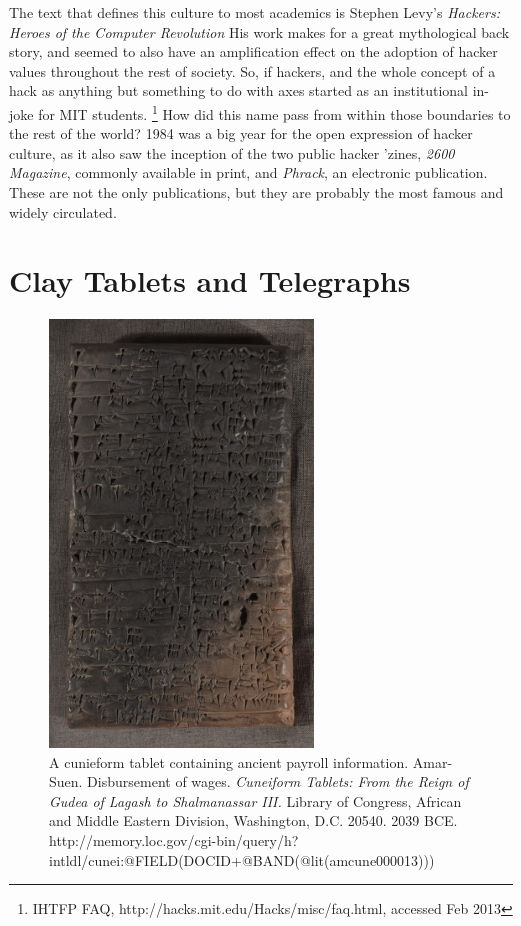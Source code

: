 \documentclass[11pt]{article}
\begin{document}
The text that defines this culture to most academics is Stephen Levy's \emph{Hackers: Heroes of the Computer Revolution}  His work makes for a great mythological back story, and seemed to also have an amplification effect on the adoption of hacker values throughout the rest of society.  So, if hackers, and the whole concept of a hack as anything but something to do with axes started as an institutional in-joke for MIT students.
\footnote{IHTFP FAQ,  http://hacks.mit.edu/Hacks/misc/faq.html, accessed Feb 2013}
How did this name pass from within those boundaries to the rest of the world? 1984 was a big year for the open expression of hacker culture, as it also saw the inception of the two public hacker 'zines, \emph{2600 Magazine}, commonly available in print, and \emph{Phrack}, an electronic publication. These are not the only publications, but they are probably the most famous and widely circulated.

\newpage
\section{Clay Tablets and Telegraphs}

\begin{figure}[ht!]
\center
\includegraphics[width=70mm, angle=90]{cuniform_tablet.jpg}
\caption{A cunieform tablet containing ancient payroll information. Amar-Suen. Disbursement of wages. \emph{Cuneiform Tablets: From the Reign of Gudea of Lagash to Shalmanassar III.} Library of Congress, African and Middle Eastern Division, Washington, D.C. 20540. 2039 BCE. http://memory.loc.gov/cgi-bin/query/h?intldl/cunei:@FIELD(DOCID+@BAND(@lit(amcune000013)))}
\end{figure}
\end{document}
